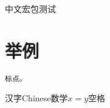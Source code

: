 \documentclass{article}
\begin{document}
中文宏包测试

\section{举例}

\begin{verbatim}
标点。
\end{verbatim}
 
汉字Chinese数学$x=y$空格
\end{document}
